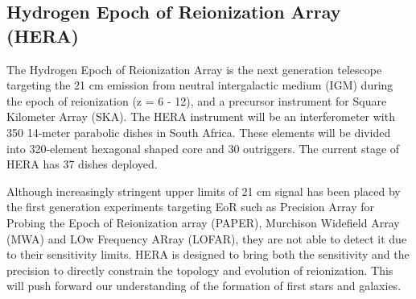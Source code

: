 \documentclass[a0,landscape]{a0poster}
\begin{document}
\begin{multicols}{4}

\section*{Hydrogen Epoch of Reionization Array (HERA)}

The Hydrogen Epoch of Reionization Array is the next generation telescope targeting the 21 cm emission from neutral intergalactic medium (IGM) during the epoch of reionization (z = 6 - 12), and a precursor instrument for Square Kilometer Array (SKA). The HERA instrument will be an interferometer with 350 14-meter parabolic dishes in South Africa. These elements will be divided into 320-element hexagonal shaped core and 30 outriggers. The current stage of HERA has 37 dishes deployed. 

Although increasingly stringent upper limits of 21 cm signal has been placed by the first generation experiments targeting EoR such as Precision Array for Probing the Epoch of Reionization array (PAPER), Murchison Widefield Array (MWA) and LOw Frequency ARray (LOFAR), they are not able to detect it due to their sensitivity limits. HERA is designed to bring both the sensitivity and the precision to directly constrain the topology and evolution of reionization. This will push forward our understanding of the formation of first stars and galaxies. \\


\end{multicols}
\end{document}
